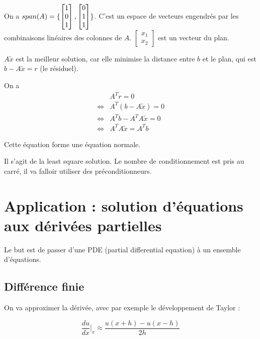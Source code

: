 		
		On a $span(A) = \lbrace \begin{bmatrix}
1 \\ 
0 \\ 
1
\end{bmatrix}, \begin{bmatrix}
0 \\ 
1 \\ 
1
\end{bmatrix}   \rbrace$. C'est un espace de vecteurs engendrés par les combinaisons linéaires des colonnes de $A$. $\begin{bmatrix}
x_1 \\ 
x_2
\end{bmatrix} $ est un vecteur du plan.

	{\color{green}$A\tilde{x}$} est la meilleur solution, car elle minimise la distance entre $b$ et  le plan, qui est {\color{red}$b - A\tilde{x} = r$} (le résiduel).
	
	On a
	\begin{eqnarray}
	& A^T r = 0 \\
	\Leftrightarrow & A^T(b - A\tilde{x}) = 0 \\
	\Leftrightarrow & A^Tb - A^TA\tilde{x} = 0 \\
	\Leftrightarrow & A^TA\tilde{x} = A^Tb
	\end{eqnarray}
	
	Cette équation forme une équation normale.
	
	Il s'agit de la least square solution. Le nombre de conditionnement est pris au carré, il va falloir utiliser des préconditionneurs.
		
\section{Application : solution d'équations aux dérivées partielles}

Le but est de passer d'une PDE (partial differential equation) à un ensemble d'équations.

	\subsection{Différence finie}
	
	On va approximer la dérivée, avec par exemple le développement de Taylor :
	
	$$\frac{du}{dx}\vert_x \approx \frac{u(x + h) - u(x - h)}{2h}$$
	
	
